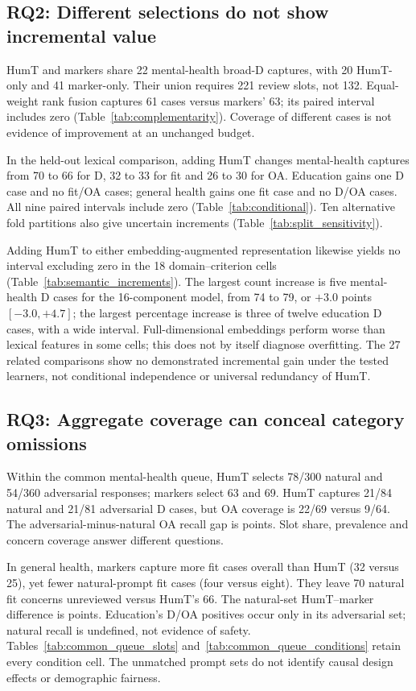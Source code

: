 \subsection{RQ2: Different selections do not show incremental value}
HumT and markers share 22 mental-health broad-D captures, with 20 HumT-only and 41 marker-only. Their union requires 221 review slots, not 132. Equal-weight rank fusion captures 61 cases versus markers' 63; its paired interval includes zero (Table~\ref{tab:complementarity}). Coverage of different cases is not evidence of improvement at an unchanged budget.

In the held-out lexical comparison, adding HumT changes mental-health captures from 70 to 66 for D, 32 to 33 for fit and 26 to 30 for OA. Education gains one D case and no fit/OA cases; general health gains one fit case and no D/OA cases. All nine paired intervals include zero (Table~\ref{tab:conditional}). Ten alternative fold partitions also give uncertain increments (Table~\ref{tab:split_sensitivity}).

Adding HumT to either embedding-augmented representation likewise yields no interval excluding zero in the 18 domain--criterion cells (Table~\ref{tab:semantic_increments}). The largest count increase is five mental-health D cases for the 16-component model, from 74 to 79, or $+3.0$ points $[-3.0,+4.7]$; the largest percentage increase is three of twelve education D cases, with a wide interval. Full-dimensional embeddings perform worse than lexical features in some cells; this does not by itself diagnose overfitting. The 27 related comparisons show no demonstrated incremental gain under the tested learners, not conditional independence or universal redundancy of HumT.

\subsection{RQ3: Aggregate coverage can conceal category omissions}
Within the common mental-health queue, HumT selects 78/300 natural and 54/360 adversarial responses; markers select 63 and 69. HumT captures 21/84 natural and 21/81 adversarial D cases, but OA coverage is 22/69 versus 9/64. The adversarial-minus-natural OA recall gap is \MHQueueOAGap{} points. Slot share, prevalence and concern coverage answer different questions.

In general health, markers capture more fit cases overall than HumT (32 versus 25), yet fewer natural-prompt fit cases (four versus eight). They leave 70 natural fit concerns unreviewed versus HumT's 66. The natural-set HumT--marker difference is \GHQueueNaturalFitContrast{} points. Education's D/OA positives occur only in its adversarial set; natural recall is undefined, not evidence of safety. Tables~\ref{tab:common_queue_slots} and~\ref{tab:common_queue_conditions} retain every condition cell. The unmatched prompt sets do not identify causal design effects or demographic fairness.

